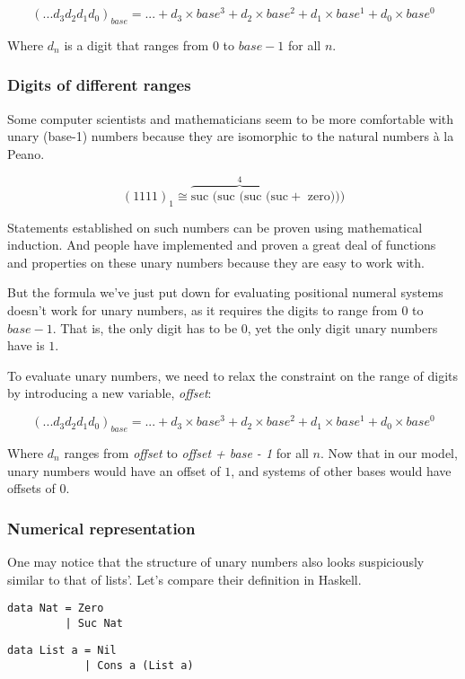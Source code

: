 \documentclass[12pt, a4paper]{article}
\begin{document}
$$
    ({...d_3d_2d_1d_0})_{base}
    =
    ... + d_3\times base^3 + d_2\times base^2 + d_1\times base^1 + d_0\times base^0
$$

Where $ d_{n} $ is a digit that ranges from $ 0 $ to $ base - 1 $ for all $ n $.


\subsubsection{Digits of different ranges}

Some computer scientists and mathematicians seem to be more comfortable with
unary (base-1) numbers because they are isomorphic to the natural numbers à la Peano.


$$
    (1111)_{1} \cong
        \overbrace{\text{suc (suc (suc (suc}}^4 + \text{ zero)))}
$$

Statements established on such numbers can be proven using mathematical
induction. And people have implemented and proven a great deal of functions and
properties on these unary numbers because they are easy to work with.

But the formula we've just put down for evaluating positional numeral systems
doesn't work for unary numbers, as it requires the digits to range from $ 0 $ to
$ base - 1 $. That is, the only digit has to be $ 0 $, yet the only digit unary
numbers have is $ 1 $.

To evaluate unary numbers, we need to relax the constraint on the range of digits
by introducing a new variable, \textit{offset}:

$$
    ({...d_3d_2d_1d_0})_{base}
    =
    ... + d_3\times base^3 + d_2\times base^2 + d_1\times base^1 + d_0\times base^0
$$

Where $ d_{n} $ ranges from \textit{offset} to \textit{offset + base - 1} for
all $ n $. Now that in our model, unary numbers would have an offset of $ 1 $,
and systems of other bases would have offsets of $ 0 $.

\subsubsection{Numerical representation}


One may notice that the structure of unary numbers also looks suspiciously similar
to that of lists'. Let's compare their definition in Haskell.

\noindent\begin{minipage}{.45\textwidth}
\begin{lstlisting}
data Nat = Zero
         | Suc Nat
\end{lstlisting}
\end{minipage}\hfill
\begin{minipage}{.48\textwidth}
\begin{lstlisting}
data List a = Nil
            | Cons a (List a)
\end{lstlisting}
\end{minipage}
\end{document}
